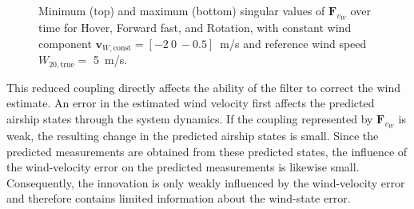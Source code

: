 \begin{figure}[htbp]
{%
	}
	\caption{Minimum (top) and maximum (bottom) singular values of $\bm{F}_{v_W}$ over time for Hover, Forward fast, and Rotation, with constant wind component $\bm{v}_{W,\mathrm{const}} = [-2\ 0\ -0.5]$\SI{}{m/s} and reference wind speed $W_{20,\mathrm{true}} =$ \SI{5}{m/s}.}
	\label{fig:EKFvsUKF_Sigmas}
\end{figure}

This reduced coupling directly affects the ability of the filter to correct the wind estimate. An error in the estimated wind velocity first affects the predicted airship states through the system dynamics. If the coupling represented by $\bm{F}_{v_W}$ is weak, the resulting change in the predicted airship states is small. Since the predicted measurements are obtained from these predicted states, the influence of the wind-velocity error on the predicted measurements is likewise small. 
Consequently, the innovation is only weakly influenced by the wind-velocity error and therefore contains limited information about the wind-state error.

